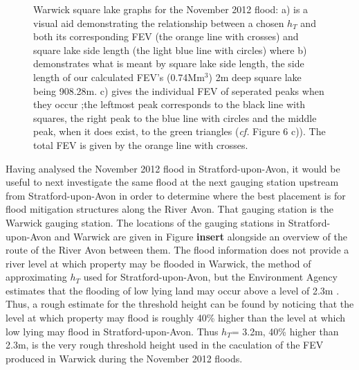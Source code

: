 \documentclass[11pt,a4paper]{article}
\begin{document}
\begin{figure}[ht!]
\centering
{}
\hfill
{}
\caption{Warwick square lake graphs for the November 2012 flood: a) is a visual aid demonstrating the relationship between a chosen $h_T$ and both its corresponding FEV (the orange line with crosses) and square lake side length (the light blue line with circles) where b) demonstrates what is meant by square lake side length, the side length of our calculated FEV's (0.74Mm$^3$) 2m deep square lake being 908.28m. c) gives the individual FEV of seperated peaks when they occur {;}the leftmost peak corresponds to the black line with squares, the right peak to the blue line with circles and the middle peak, when it does exist, to the green triangles (\textit{cf.} Figure 6 c)). The total FEV is given by the orange line with crosses.}
\end{figure}

\noindent Having analysed the November 2012 flood in Stratford-upon-Avon, it would be useful to next investigate the same flood at the next gauging station upstream from Stratford-upon-Avon in order to determine where the best placement is for flood mitigation structures along the River Avon. That gauging station is the Warwick gauging station. The locations of the gauging stations in Stratford-upon-Avon and Warwick are given in Figure \textbf{insert} alongside an overview of the route of the River Avon between them. The flood information does not provide a river level at which property may be flooded in Warwick, the method of approximating $h_T$ used for Stratford-upon-Avon, but the Environment Agency estimates that the flooding of low lying land may occur above a level of 2.3m \cite{EA}. Thus, a rough estimate for the threshold height can be found by noticing that the level at which property may flood is roughly 40\% higher than the level at which low lying may flood in Stratford-upon-Avon. Thus $h_T$= 3.2m, 40\% higher than 2.3m, is the very rough threshold height used in the caculation of the FEV produced in Warwick during the November 2012 floods.
\end{document}
